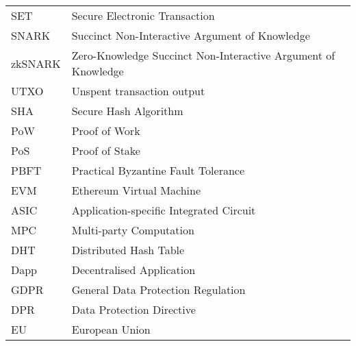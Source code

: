 
\abbreviations
\begin{center}
	\renewcommand{\arraystretch}{1.5}
	\begin{longtable}{ l @{\qquad} l }
	\toprule
	SET    & Secure Electronic Transaction \\
	SNARK & Succinct Non-Interactive Argument of Knowledge \\
	zkSNARK    & Zero-Knowledge Succinct Non-Interactive Argument of Knowledge \\
	UTXO    & Unspent transaction output \\
	SHA    & Secure Hash Algorithm \\
	PoW    & Proof of Work \\
	PoS    & Proof of Stake \\
	PBFT    & Practical Byzantine Fault Tolerance \\
	EVM    & Ethereum Virtual Machine \\
	ASIC    & Application-specific Integrated Circuit \\
	MPC    & Multi-party Computation \\
	DHT    & Distributed Hash Table \\
	Dapp    & Decentralised Application \\
	GDPR    & General Data Protection Regulation \\
	DPR    & Data Protection Directive \\
	EU    & European Union \\
	\bottomrule
	\end{longtable}
\end{center}
